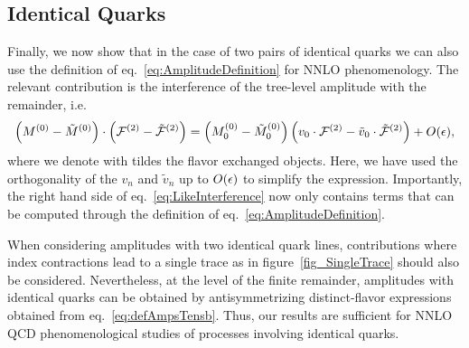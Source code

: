 \subsection{Identical Quarks}
Finally, we now show that in the case of two pairs of
identical quarks we can also use the
definition of eq.~\eqref{eq:AmplitudeDefinition} 
for NNLO phenomenology.
The relevant contribution is the interference of the 
tree-level amplitude with the remainder, i.e.
\begin{equation}
  \left(M^{(0)} - \tilde{M}^{(0)}\right) \cdot \left( \mathcal{F}^{(2)} - \tilde{\mathcal{F}}^{(2)}\right)
  =
  \left(M^{(0)}_0 - \tilde{M}^{(0)}_0 \right) \left( v_0\cdot \mathcal{F}^{(2)} - \tilde{v}_0\cdot \tilde{\mathcal{F}}^{(2)}\right) + O(\epsilon),
  \label{eq:LikeInterference}
\end{equation}
where we denote with tildes the flavor exchanged objects.  Here, we
have used the orthogonality of the $v_n$ and $\tilde{v}_n$ up to
$O(\epsilon)$ to simplify the expression. Importantly, the right hand side
of eq.~\eqref{eq:LikeInterference} now only contains terms that can be
computed through the definition of 
eq.~\eqref{eq:AmplitudeDefinition}.


When considering amplitudes with two identical quark lines, contributions where
index contractions lead to a single trace as in figure~\ref{fig_SingleTrace} 
should also be considered. Nevertheless, at the level of the
finite remainder, amplitudes with identical quarks can be obtained by
antisymmetrizing distinct-flavor
expressions~\cite{DeFreitas:2004kmi,Abreu:2018jgq} obtained from
eq.~\eqref{eq:defAmpsTensb}. Thus, our results are sufficient for 
NNLO QCD phenomenological studies of processes involving 
identical quarks.

